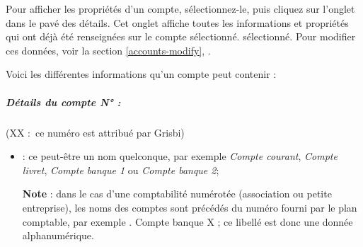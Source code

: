 Pour afficher les propriétés d'un compte, sélectionnez-le, puis cliquez sur l'onglet  dans le pavé des détails. Cet onglet affiche toutes les informations et propriétés qui ont déjà été renseignées sur le compte \ifIllustration sélectionné.
\else sélectionné.
\fi
Pour modifier ces données, voir la section \vref{accounts-modify}, .

Voici les différentes informations qu'un compte peut contenir :

\subparagraph{Détails du  compte N° :} (XX : ce numéro est attribué par Grisbi)

\begin{itemize}
	\item {} : ce peut-être un nom quelconque, par exemple \emph{Compte courant}, \emph{Compte livret}, \emph{Compte banque 1} ou \emph{Compte banque 2};	

\textbf{Note} : dans le cas d'une comptabilité numérotée (association ou petite entreprise), les noms des comptes sont précédés du numéro fourni par le plan comptable, par exemple . Compte banque X \fg{} ; ce libellé est donc une donnée alphanumérique.


\end{itemize}
